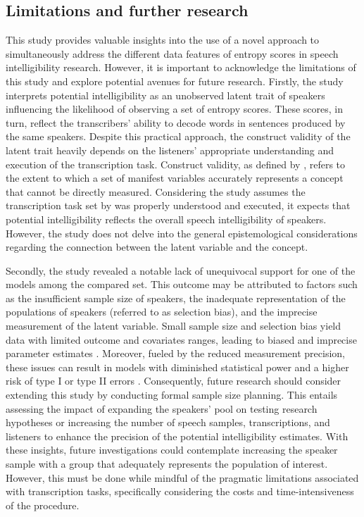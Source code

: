 \documentclass[
  authoryear,
  preprint,
  1p]{elsarticle}
\begin{document}
\subsection{Limitations and further research}\label{sec-D-LFR}

This study provides valuable insights into the use of a novel approach
to simultaneously address the different data features of entropy scores
in speech intelligibility research. However, it is important to
acknowledge the limitations of this study and explore potential avenues
for future research. Firstly, the study interprets potential
intelligibility as an unobserved latent trait of speakers influencing
the likelihood of observing a set of entropy scores. These scores, in
turn, reflect the transcribers' ability to decode words in sentences
produced by the same speakers. Despite this practical approach, the
construct validity of the latent trait heavily depends on the listeners'
appropriate understanding and execution of the transcription task.
Construct validity, as defined by \citet{Cronbach_et_al_1955}, refers to
the extent to which a set of manifest variables accurately represents a
concept that cannot be directly measured. Considering the study assumes
the transcription task set by \citet{Boonen_et_al_2023} was properly
understood and executed, it expects that potential intelligibility
reflects the overall speech intelligibility of speakers. However, the
study does not delve into the general epistemological considerations
regarding the connection between the latent variable and the concept.

Secondly, the study revealed a notable lack of unequivocal support for
one of the models among the compared set. This outcome may be attributed
to factors such as the insufficient sample size of speakers, the
inadequate representation of the populations of speakers (referred to as
selection bias), and the imprecise measurement of the latent variable.
Small sample size and selection bias yield data with limited outcome and
covariates ranges, leading to biased and imprecise parameter estimates
\citep{Everitt_et_al_2010}. Moreover, fueled by the reduced measurement
precision, these issues can result in models with diminished statistical
power and a higher risk of type I or type II errors
\citep{McElreath_2020}. {Consequently, future research should consider
extending this study by conducting formal sample size planning. This
entails assessing the impact of expanding the speakers' pool on testing
research hypotheses or increasing the number of speech samples,
transcriptions, and listeners to enhance the precision of the potential
intelligibility estimates. With these insights, future investigations
could contemplate increasing the speaker sample with a group that
adequately represents the population of interest.} However, this must be
done while mindful of the pragmatic limitations associated with
transcription tasks, specifically considering the costs and
time-intensiveness of the procedure.
\end{document}
